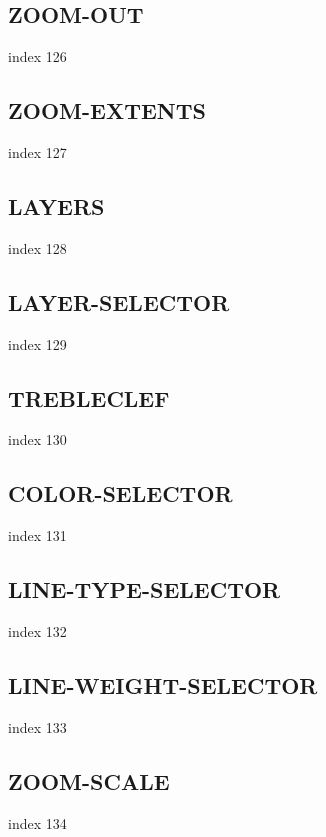 \documentclass[a4paper]{report}
\begin{document}
\subsection{ZOOM-OUT}

index 126

\subsection{ZOOM-EXTENTS}

index 127

\subsection{LAYERS}

index 128

\subsection{LAYER-SELECTOR}

index 129

\subsection{TREBLECLEF}

index 130

\subsection{COLOR-SELECTOR}

index 131

\subsection{LINE-TYPE-SELECTOR}

index 132

\subsection{LINE-WEIGHT-SELECTOR}

index 133

\subsection{ZOOM-SCALE}

index 134
\end{document}
